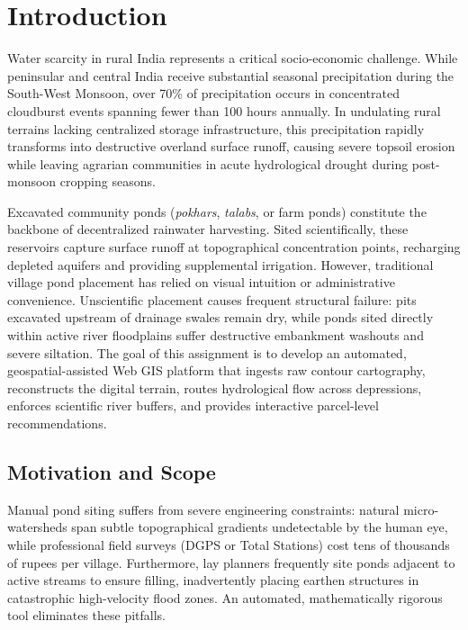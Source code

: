 \documentclass[manuscript,screen,review]{acmart}
\begin{document}

\maketitle

\section{Introduction}
\label{sec:intro}
Water scarcity in rural India represents a critical socio-economic challenge. While peninsular and central India receive substantial seasonal precipitation during the South-West Monsoon, over 70\% of precipitation occurs in concentrated cloudburst events spanning fewer than 100 hours annually. In undulating rural terrains lacking centralized storage infrastructure, this precipitation rapidly transforms into destructive overland surface runoff, causing severe topsoil erosion while leaving agrarian communities in acute hydrological drought during post-monsoon cropping seasons.

Excavated community ponds (\emph{pokhars}, \emph{talabs}, or farm ponds) constitute the backbone of decentralized rainwater harvesting. Sited scientifically, these reservoirs capture surface runoff at topographical concentration points, recharging depleted aquifers and providing supplemental irrigation. However, traditional village pond placement has relied on visual intuition or administrative convenience. Unscientific placement causes frequent structural failure: pits excavated upstream of drainage swales remain dry, while ponds sited directly within active river floodplains suffer destructive embankment washouts and severe siltation. The goal of this assignment is to develop an automated, geospatial-assisted Web GIS platform that ingests raw contour cartography, reconstructs the digital terrain, routes hydrological flow across depressions, enforces scientific river buffers, and provides interactive parcel-level recommendations.

\subsection{Motivation and Scope}
Manual pond siting suffers from severe engineering constraints: natural micro-watersheds span subtle topographical gradients undetectable by the human eye, while professional field surveys (DGPS or Total Stations) cost tens of thousands of rupees per village. Furthermore, lay planners frequently site ponds adjacent to active streams to ensure filling, inadvertently placing earthen structures in catastrophic high-velocity flood zones. An automated, mathematically rigorous tool eliminates these pitfalls.
\end{document}
